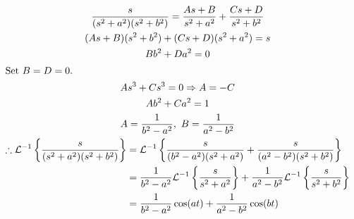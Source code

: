 \documentclass[12pt]{article}
\newenvironment{problem}[2][Problem]{\begin{trivlist}
\item[\hskip \labelsep {\bfseries #1}\hskip \labelsep {\bfseries #2.}]}{\end{trivlist}}
\begin{document}
\begin{problem}{2.b}
\end{problem}
\begin{gather*}
	\frac{s}{(s^2+a^2)(s^2+b^2)} 
		=
		\frac{As + B}{s^2+a^2}
		+ \frac{Cs + D}{s^2+b^2}
	\\
	(As+B) (s^2+b^2) + (Cs+D) (s^2+a^2) = s \\
	Bb^2 + Da^2 = 0 \\
	\intertext{Set $B = D = 0$.}
	As^3 + Cs^3 = 0 \Rightarrow A = -C \\
	Ab^2 + Ca^2 = 1 \\
	A = \frac{1}{b^2-a^2},\ B = \frac{1}{a^2-b^2} \\
	\begin{aligned}
		\therefore \mathcal{L}^{-1} \left\{ \frac{s}{(s^2+a^2)(s^2+b^2)} \right\}
		&= \mathcal{L}^{-1} \left\{ 
			\frac{s}{(b^2-a^2)(s^2+a^2)} 
			+
			\frac{s}{(a^2-b^2)(s^2+b^2)} 
		\right\} \\
		&= 
			\frac{1}{b^2-a^2} 
			\mathcal{L}^{-1} \left\{ 
				\frac{s}{s^2+a^2} 
			\right\} 
			+
			\frac{1}{a^2-b^2} 
			\mathcal{L}^{-1} \left\{ 
				\frac{s}{s^2+b^2} 
			\right\} 
		\\
		&= 
			\frac{1}{b^2-a^2} 
			\cos(at)
			+
			\frac{1}{a^2-b^2} 
			\cos(bt)
	\end{aligned}
\end{gather*}
\end{document}
